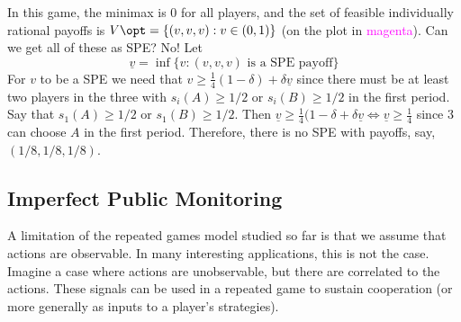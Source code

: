 \documentclass[10pt]{article}
\begin{document}
\begin{remark}
	In this game, the minimax is 0 for all players, and the set of feasible individually rational payoffs is $V\opt = \{(v,v,v) : v \in (0,1)\}$ (on the plot in \textcolor{magenta}{magenta}). Can we get all of these as SPE? No! Let
	\[\underline{v} = \inf\{v : (v,v,v) \text{ is a SPE payoff} \}\]
	For $v$ to be a SPE we need that $v \ge \frac{1}{4}(1-\delta) + \delta \underline{v}$ since there must be at least two players in the three with $s_i(A) \ge 1/2$ or $s_i(B) \ge 1/2$ in the first period. Say that $s_1(A) \ge 1/2$ or $s_1(B) \ge 1/2$. Then $\underline{v} \ge \frac{1}{4}(1-\delta + \delta \underline{v} \Longleftrightarrow \underline{v} \ge \frac{1}{4}$ since 3 can choose $A$ in the first period. Therefore, there is no SPE with payoffs, say, $(1/8,1/8,1/8)$. 
\end{remark}



\subsection{Imperfect Public Monitoring}

A limitation of the repeated games model studied so far is that we assume that actions are observable. In many interesting applications, this is not the case. Imagine a case where actions are unobservable, but there are  correlated to the actions. These signals can be used in a repeated game to sustain cooperation (or more generally as inputs to a player's strategies). 
\end{document}

